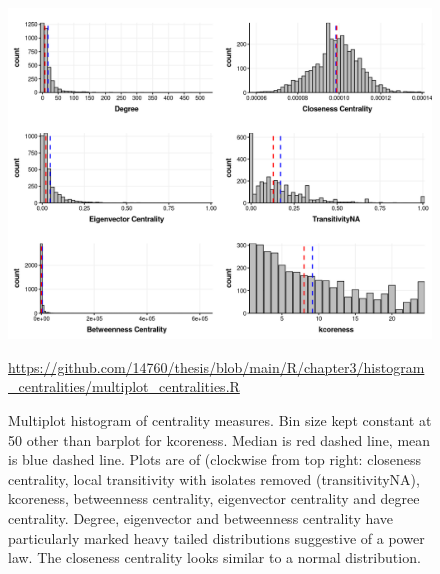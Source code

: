 \begin{figure}
    \centering
     \includegraphics[width=\textwidth]{images/chapter3/ggplot2/theme/multiplot_centrality/centrality_histogram_multiplot.png}
    \caption[Multiplot histogram of centrality measures]{Multiplot histogram of centrality measures. Bin size kept constant at 50 other than barplot for kcoreness. Median is red dashed line, mean is blue dashed line. Plots are of (clockwise from top right: closeness centrality, local transitivity with isolates removed (transitivityNA), kcoreness, betweenness centrality, eigenvector centrality and degree centrality. Degree, eigenvector and betweenness centrality have particularly marked heavy tailed distributions suggestive of a power law. The closeness centrality looks similar to a normal distribution.}
    \tiny\url{https://github.com/14760/thesis/blob/main/R/chapter3/histogram_centralities/multiplot_centralities.R}
    \label{fig:multiplot centrality histograms}
\end{figure}


       

